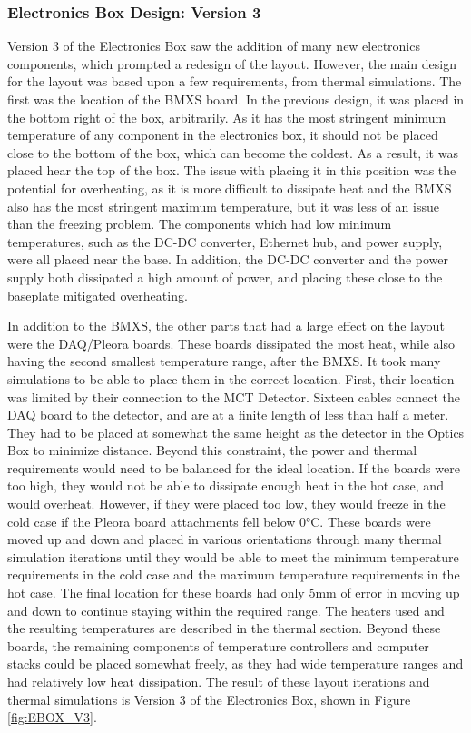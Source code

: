 \subsubsection{Electronics Box Design: Version 3}
Version 3 of the Electronics Box saw the addition of many new electronics components, which prompted a redesign of the layout. However, the main design for the layout was based upon a few requirements, from thermal simulations. The first was the location of the BMXS board. In the previous design, it was placed in the bottom right of the box, arbitrarily. As it has the most stringent minimum temperature of any component in the electronics box, it should not be placed close to the bottom of the box, which can become the coldest. As a result, it was placed hear the top of the box. The issue with placing it in this position was the potential for overheating, as it is more difficult to dissipate heat and the BMXS also has the most stringent maximum temperature, but it was less of an issue than the freezing problem. The components which had low minimum temperatures, such as the DC-DC converter, Ethernet hub, and power supply, were all placed near the base. In addition, the DC-DC converter and the power supply both dissipated a high amount of power, and placing these close to the baseplate mitigated overheating. 

In addition to the BMXS, the other parts that had a large effect on the layout were the DAQ/Pleora boards. These boards dissipated the most heat, while also having the second smallest temperature range, after the BMXS. It took many simulations to be able to place them in the correct location. First, their location was limited by their connection to the MCT Detector. Sixteen cables connect the DAQ board to the detector, and are at a finite length of less than half a meter. They had to be placed at somewhat the same height as the detector in the Optics Box to minimize distance. Beyond this constraint, the power and thermal requirements would need to be balanced for the ideal location. If the boards were too high, they would not be able to dissipate enough heat in the hot case, and would overheat. However, if they were placed too low, they would freeze in the cold case if the Pleora board attachments fell below 0°C. These boards were moved up and down and placed in various orientations through many thermal simulation iterations until they would be able to meet the minimum temperature requirements in the cold case and the maximum temperature requirements in the hot case. The final location for these boards had only 5mm of error in moving up and down to continue staying within the required range. The heaters used and the resulting temperatures are described in the thermal section. Beyond these boards, the remaining components of temperature controllers and computer stacks could be placed somewhat freely, as they had wide temperature ranges and had relatively low heat dissipation. The result of these layout iterations and thermal simulations is Version 3 of the Electronics Box, shown in Figure \ref{fig:EBOX_V3}.

